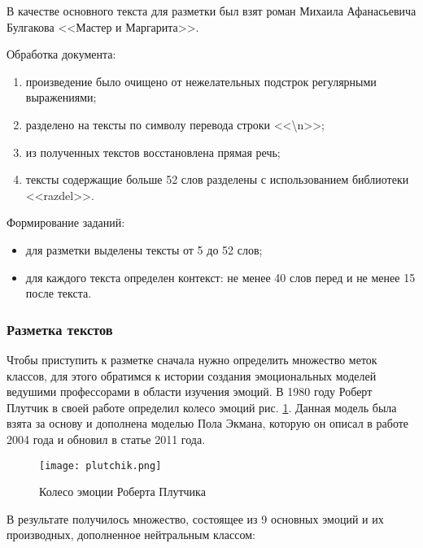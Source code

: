В качестве основного текста для разметки был взят роман Михаила Афанасьевича Булгакова <<Мастер и Маргарита>>.

\bigskip
Обработка документа:

\bigskip
\begin{enumerate}
\item произведение было очищено от нежелательных подстрок регулярными выражениями;
\item разделено на тексты по символу перевода строки <<\textbackslash n>>;
\item из полученных текстов восстановлена прямая речь;
\item тексты содержащие больше 52 слов разделены с использованием библиотеки <<razdel>>.
\end{enumerate}

\bigskip
Формирование заданий:

\bigskip
\begin{itemize}
 \item для разметки выделены тексты от 5 до 52 слов;
 \item для каждого текста определен контекст:  не менее 40 слов перед и не менее 15 после текста.
\end{itemize}



\subsubsection{Разметка текстов}

Чтобы приступить к разметке сначала нужно определить множество меток классов, для этого обратимся к истории создания эмоциональных моделей ведушими профессорами в области изучения эмоций. В 1980 году Роберт Плутчик в своей работе \cite{Plutchik} определил колесо эмоций рис. \ref{fig:plutchik}. Данная модель была взята за основу и дополнена моделью Пола Экмана, которую он описал в работе \cite{Ekman2004} 2004 года и обновил в статье \cite{Ekman2011} 2011 года.

\begin{figure}[ht]
    \centering
    \texttt{[image: plutchik.png]}
    \caption{Колесо эмоции Роберта Плутчика}
    \label{fig:plutchik}
\end{figure}

В результате получилось множество, состоящее из 9 основных эмоций и их производных, дополненное нейтральным классом:

